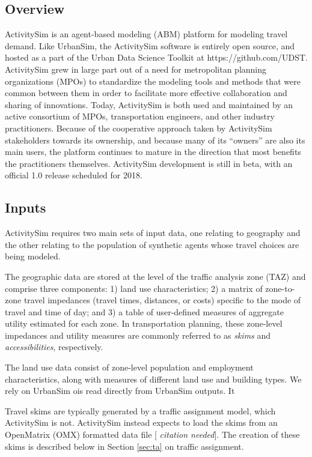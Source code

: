 \subsection{Overview}

ActivitySim is an agent-based modeling (ABM) platform for modeling travel demand. Like UrbanSim, the ActivitySim software is entirely open source, and hosted as a part of the Urban Data Science Toolkit at https://github.com/UDST. ActivitySim grew in large part out of a need for metropolitan planning organizations (MPOs) to standardize the modeling tools and methods that were common between them in order to facilitate more effective collaboration and sharing of innovations. Today, ActivitySim is both used and maintained by an active consortium of MPOs, transportation engineers, and other industry practitioners. Because of the cooperative approach taken by ActivitySim stakeholders towards its ownership, and because many of its \enquote{owners} are also its main users, the platform continues to mature in the direction that most benefits the practitioners themselves. ActivitySim development is still in beta, with an official 1.0 release scheduled for 2018.

\subsection{Inputs}

ActivitySim requires two main sets of input data, one relating to geography and the other relating to the population of synthetic agents whose travel choices are being modeled.

The geographic data are stored at the level of the traffic analysis zone (TAZ) and comprise three components: 1) land use characteristics; 2) a matrix of zone-to-zone travel impedances (travel times, distances, or costs) specific to the mode of travel and time of day; and 3) a table of user-defined measures of aggregate utility estimated for each zone. In transportation planning, these zone-level impedances and utility measures are commonly referred to as \emph{skims} and \emph{accessibilities}, respectively.

The land use data consist of zone-level population and employment characteristics, along with measures of different land use and building types. We rely on UrbanSim ois read directly from UrbanSim outputs. It 

Travel skims are typically generated by a traffic assignment model, which ActivitySim is not. ActivitySim instead expects to load the skims from an OpenMatrix (OMX) formatted data file [ \emph{citation needed}]. The creation of these skims is described below in Section \ref{sec:ta} on traffic assignment.

